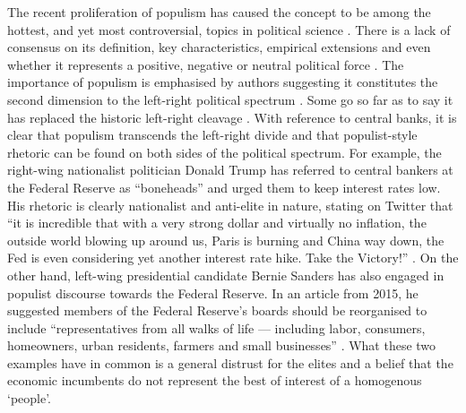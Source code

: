 \documentclass[11pt]{article}
\begin{document}
The recent proliferation of populism has caused the concept to be among the hottest, and yet most controversial, topics in political science \citep{brubaker2020populism}. There is a lack of consensus on its definition, key characteristics, empirical extensions and even whether it represents a positive, negative or neutral political force \citep{bergmann2020populism, brubaker2020populism, caiani2019understanding}. The importance of populism is emphasised by authors suggesting it constitutes the second dimension to the left-right political spectrum \citep{koch2021varieties}. Some go so far as to say it has replaced the historic left-right cleavage \citep{de2018populism}. With reference to central banks, it is clear that populism transcends the left-right divide and that populist-style rhetoric can be found on both sides of the political spectrum. For example, the right-wing nationalist politician Donald Trump has referred to central bankers at the Federal Reserve as ``boneheads'' and urged them to keep interest rates low. His rhetoric is clearly nationalist and anti-elite in nature, stating on Twitter that ``it is incredible that with a very strong dollar and virtually no inflation, the outside world blowing up around us, Paris is burning and China way down, the Fed is even considering yet another interest rate hike. Take the Victory!'' \cite[pg.~9]{binder2021technopopulism}. On the other hand, left-wing presidential candidate Bernie Sanders has also engaged in populist discourse towards the Federal Reserve. In an article from 2015, he suggested members of the Federal Reserve's boards should be reorganised to include ``representatives from all walks of life — including labor, consumers, homeowners, urban residents, farmers and small businesses'' \citep{sanders2015bernie}. What these two examples have in common is a general distrust for the elites and a belief that the economic incumbents do not represent the best of interest of a homogenous `people'.
\end{document}
